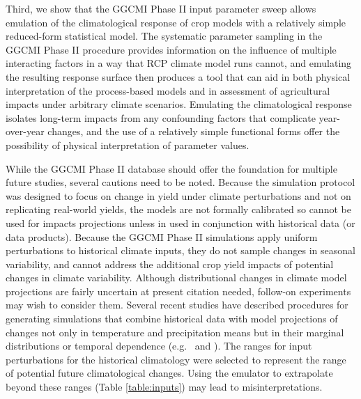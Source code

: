 \documentclass[esd, final]{copernicus} %
\begin{document}
{\color{blue}
Third, we show that the GGCMI Phase II input parameter sweep allows emulation of the climatological response of crop models with a relatively simple reduced-form statistical model. The systematic parameter sampling in the GGCMI Phase II procedure provides information on the influence of multiple interacting factors in a way that RCP climate model runs cannot, and emulating the resulting response surface then produces a tool that can aid in both physical interpretation of the process-based models and in assessment of agricultural impacts under arbitrary climate scenarios. Emulating the climatological response isolates long-term impacts from any confounding factors that complicate year-over-year changes, and the use of a relatively simple functional forms offer the possibility of physical interpretation of parameter values. 


While the GGCMI Phase II database should offer the foundation for multiple future studies, several cautions need to be noted. Because the simulation protocol was designed to focus on change in yield under climate perturbations and not on replicating real-world yields, the models are not formally calibrated so cannot be used for impacts projections unless in used in conjunction with historical data (or data products). Because the GGCMI Phase II simulations apply uniform perturbations to historical climate inputs, they do not sample changes in seasonal variability, and cannot address the additional crop yield impacts of potential {\color{red}changes in climate variability}. Although distributional changes in climate model projections are fairly uncertain at present {\color{red} citation needed}, follow-on experiments may wish to consider them. Several recent studies have described procedures for generating simulations that combine historical data with model projections of changes not only in temperature and precipitation means but in their marginal distributions or temporal dependence (e.g.\ \citet{Leeds2015, poppick2016, Won16} and \citet{Haugen2018}). The ranges for input perturbations for the historical climatology were selected to represent the range of potential future climatological changes. Using the emulator to extrapolate beyond these ranges (Table \ref{table:inputs}) may lead to misinterpretations. 

}
\end{document}
